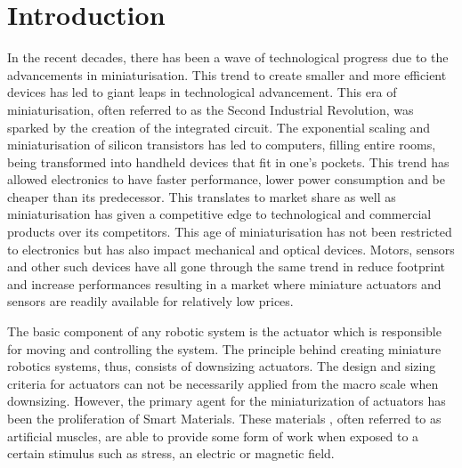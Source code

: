 
\cleardoublepage
\chapter*{Introduction}
In the recent decades, there has been a wave of technological progress due to the advancements in miniaturisation. This trend to create smaller and more efficient devices has led to giant leaps in technological advancement. This era of miniaturisation, often referred to as the Second Industrial Revolution, was sparked by the creation of the integrated circuit. The exponential scaling and miniaturisation of silicon transistors has led to computers, filling entire rooms, being transformed into handheld devices that fit in one's pockets. This trend has allowed electronics to have faster performance, lower power consumption and be cheaper than its predecessor. This translates to market share as well as miniaturisation has given a competitive edge to technological and commercial products over its competitors. This age of miniaturisation has not been restricted to electronics but has also impact mechanical and optical devices. Motors, sensors and other such devices have all gone through the same trend in reduce footprint and increase performances resulting in a market where miniature actuators and sensors are readily available for relatively low prices.

The basic component of any robotic system is the actuator which is responsible for moving and controlling the system. The principle behind creating miniature robotics systems, thus, consists of downsizing actuators. The design and sizing criteria for actuators can not be necessarily applied from the macro scale when downsizing. However, the primary agent for the miniaturization of actuators has been the proliferation of Smart Materials. These materials , often referred to as artificial muscles, are able to provide some form of work when exposed to a certain stimulus such as stress, an electric or magnetic field.





